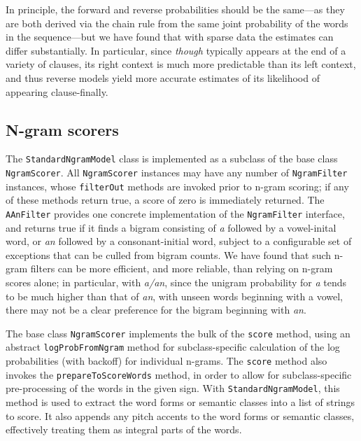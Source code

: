\documentclass[11pt]{article}
\newcommand{\code}[1]{\texttt{#1}} %
\begin{document}
\noindent In principle, the forward and reverse probabilities should be
the same---as they are both derived via the chain rule from the same
joint probability of the words in the sequence---but we have found that
with sparse data the estimates can differ substantially. In particular,
since \textit{though} typically appears at the end of a variety of
clauses, its right context is much more predictable than its left
context, and thus reverse models yield more accurate estimates of its
likelihood of appearing clause-finally. 

\subsection{N-gram scorers}

The \code{Standard\-Ngram\-Model} class is implemented as a subclass of
the base class \code{Ngram\-Scorer}. All \code{Ngram\-Scorer} instances
may have any number of \code{Ngram\-Filter} instances, whose
\code{filter\-Out} methods are invoked prior to n-gram scoring; if any
of these methods return true, a score of zero is immediately returned.
The \code{AAn\-Filter} provides one concrete implementation of the
\code{Ngram\-Filter} interface, and returns true if it finds a bigram
consisting of \textit{a} followed by a vowel-inital word, or \textit{an}
followed by a consonant-initial word, subject to a configurable set of
exceptions that can be culled from bigram counts. We have found that
such n-gram filters can be more efficient, and more reliable, than
relying on n-gram scores alone; in particular, with \textit{a/an}, since
the unigram probability for \textit{a} tends to be much higher than that
of \textit{an}, with unseen words beginning with a vowel, there may not
be a clear preference for the bigram beginning with \textit{an}.

The base class \code{Ngram\-Scorer} implements the bulk of the
\code{score} method, using an abstract \code{log\-Prob\-From\-Ngram} method
for subclass-specific calculation of the log probabilities (with
backoff) for individual n-grams. The \code{score} method also invokes
the \code{prepare\-To\-Score\-Words} method, in order to allow for
subclass-specific pre-processing of the words in the given sign. With
\code{Standard\-Ngram\-Model}, this method is used to extract the word forms
or semantic classes into a list of strings to score. It also appends any
pitch accents to the word forms or semantic classes, effectively
treating them as integral parts of the words.
\end{document}
